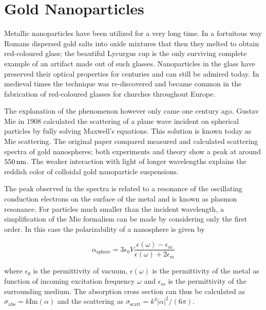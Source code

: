 \section{Gold Nanoparticles}
Metallic nanoparticles have been utilized for a very long time. In a fortuitous
way Romans dispersed gold salts into oxide mixtures that then they melted to
obtain red-coloured glass; the beautiful Lycurgus
cup\cite{barber1990investigation} is the only surviving complete example of an
artifact made out of such glasses. Nanoparticles in the glass have preserved
their optical properties for centuries and can still be admired today. In
medieval times the technique was re-discovered and became common in the
fabrication of red-coloured glasses for churches throughout Europe. 

The explanation of the phenomenon however only came one century ago. Gustav Mie
in $1908$ calculated the scattering of a plane wave incident on spherical
particles\cite{mie1908beitrage} by fully solving Maxwell's equations.
This solution is known today as Mie scattering. The original paper compared
measured and calculated scattering spectra of gold nanospheres; both experiments
and theory show a peak at around $550\,\textrm{nm}$. The weaker interaction with light of
longer wavelengths explains the reddish color of colloidal gold nanoparticle
suspensions.

The peak observed in the spectra is related to a resonance of the oscillating
conduction electrons on the surface of the metal and is known as plasmon resonance. For
particles much smaller than the incident wavelength, a simplification of the Mie
formalism can be made by considering only the first order. In this case the
polarizability of a nanosphere is given by\cite{bohren2008absorption}

\begin{equation}\label{eqn:polarizability}
	\alpha_{\textrm{sphere}} =
	3\epsilon_0V\frac{\epsilon(\omega)-\epsilon_m}{\epsilon(\omega)+2\epsilon_m}
\end{equation}

\noindent where $\epsilon_0$ is the permittivity of vacuum, $\epsilon(\omega)$
is the permittivity of the metal as function of incoming excitation frequency $\omega$
and $\epsilon_m$ is the permittivity of the surrounding medium. The absorption
cross section can thus be calculated as
$\sigma_\textrm{abs}=k\textrm{Im}(\alpha)$ and the scattering as
$\sigma_\textrm{scatt}=k^4|\alpha|^2/(6\pi)$.

